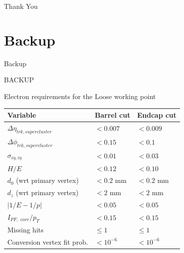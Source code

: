 \begin{frame}
\begin{center}
\huge
Thank You
\end{center}
\end{frame}


\section*{Backup}


\begin{frame}{Backup}
\begin{center}
BACKUP

\end{center}
\end{frame}


\begin{frame}{Electron requirements for the Loose working point}
\begin{center}

\begin{tabular}{|l|l|l|}
\hline
Variable & Barrel cut & Endcap cut  \\
\hline
$\Delta \eta_{trk, supercluster}$ & $<0.007$ & $<0.009$ \\
$\Delta \phi_{trk, supercluster}$ & $<0.15$ & $<0.1$ \\
$\sigma_{i\eta, i\eta}$ & $<0.01$ & $<0.03$ \\
$H/E$ & $<0.12$ & $<0.10$ \\
$d_{0}$ (wrt primary vertex) & $< 0.2$ mm & $< 0.2$ mm \\
$d_z$ (wrt primary vertex) & $< 2$ mm & $< 2$ mm \\
$|1/E - 1/p|$ & $< 0.05$ & $<0.05$ \\
$I_{PF, \,\, corr}/p_T$ & $< 0.15$ & $<0.15$ \\
Missing hits & $\le 1$ & $\le 1$ \\
Conversion vertex fit prob.& $< 10^{-6}$ & $< 10^{-6}$ \\
\hline
\end{tabular}

\end{center}
\end{frame}

